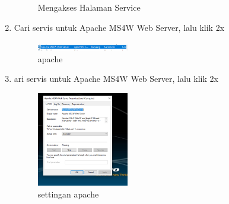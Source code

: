 \begin{enumerate}
\begin{figure}[H]
		\centering
		\caption{Mengakses Halaman Service}
    \end{figure}
  \item Cari servis untuk Apache MS4W Web Server, lalu klik 2x
  \hfill\break
    \begin{figure}[H]
    \includegraphics[width=4cm]{figures/1174096/4/g8.PNG}
    \centering
    \caption{apache}
    \end{figure}
  \item ari servis untuk Apache MS4W Web Server, lalu klik 2x
  \hfill\break
    \begin{figure}[H]
    \includegraphics[width=4cm]{figures/1174096/4/g9.PNG}
    \centering
    \caption{settingan apache}
    \end{figure}
\end{enumerate}
